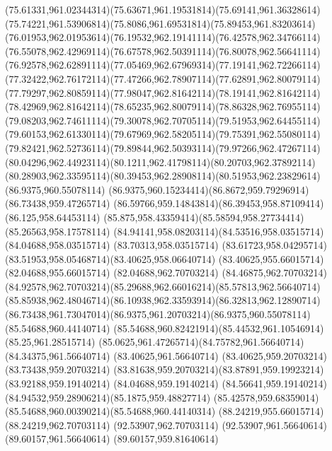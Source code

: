 {{	\curveto(75.61331,961.02344314)(75.63671,961.19531814)(75.69141,961.36328614)
	\curveto(75.74221,961.53906814)(75.8086,961.69531814)(75.89453,961.83203614)
	\curveto(76.01953,962.01953614)(76.19532,962.19141114)(76.42578,962.34766114)
	\curveto(76.55078,962.42969114)(76.67578,962.50391114)(76.80078,962.56641114)
	\curveto(76.92578,962.62891114)(77.05469,962.67969314)(77.19141,962.72266114)
	\curveto(77.32422,962.76172114)(77.47266,962.78907114)(77.62891,962.80079114)
	\curveto(77.79297,962.80859114)(77.98047,962.81642114)(78.19141,962.81642114)
	\curveto(78.42969,962.81642114)(78.65235,962.80079114)(78.86328,962.76955114)
	\curveto(79.08203,962.74611114)(79.30078,962.70705114)(79.51953,962.64455114)
	\curveto(79.60153,962.61330114)(79.67969,962.58205114)(79.75391,962.55080114)
	\curveto(79.82421,962.52736114)(79.89844,962.50393114)(79.97266,962.47267114)
	\curveto(80.04296,962.44923114)(80.1211,962.41798114)(80.20703,962.37892114)
	\curveto(80.28903,962.33595114)(80.39453,962.28908114)(80.51953,962.23829614)
	\closepath
	\moveto(86.9375,960.55078114)
	\curveto(86.9375,960.15234414)(86.8672,959.79296914)(86.73438,959.47265714)
	\curveto(86.59766,959.14843814)(86.39453,958.87109414)(86.125,958.64453114)
	\curveto(85.875,958.43359414)(85.58594,958.27734414)(85.26563,958.17578114)
	\curveto(84.94141,958.08203114)(84.53516,958.03515714)(84.04688,958.03515714)
	\lineto(83.70313,958.03515714)
	\curveto(83.61723,958.04295714)(83.51953,958.05468714)(83.40625,958.06640714)
	\lineto(83.40625,955.66015714)
	\lineto(82.04688,955.66015714)
	\lineto(82.04688,962.70703214)
	\lineto(84.46875,962.70703214)
	\curveto(84.92578,962.70703214)(85.29688,962.66016214)(85.57813,962.56640714)
	\curveto(85.85938,962.48046714)(86.10938,962.33593914)(86.32813,962.12890714)
	\curveto(86.73438,961.73047014)(86.9375,961.20703214)(86.9375,960.55078114)
	\closepath
	\moveto(85.54688,960.44140714)
	\curveto(85.54688,960.82421914)(85.44532,961.10546914)(85.25,961.28515714)
	\curveto(85.0625,961.47265714)(84.75782,961.56640714)(84.34375,961.56640714)
	\lineto(83.40625,961.56640714)
	\lineto(83.40625,959.20703214)
	\lineto(83.73438,959.20703214)
	\curveto(83.81638,959.20703214)(83.87891,959.19923214)(83.92188,959.19140214)
	\lineto(84.04688,959.19140214)
	\curveto(84.56641,959.19140214)(84.94532,959.28906214)(85.1875,959.48827714)
	\curveto(85.42578,959.68359014)(85.54688,960.00390214)(85.54688,960.44140314)
	\closepath
	\moveto(88.24219,955.66015714)
	\lineto(88.24219,962.70703114)
	\lineto(92.53907,962.70703114)
	\lineto(92.53907,961.56640614)
	\lineto(89.60157,961.56640614)
	\lineto(89.60157,959.81640614)
}}
